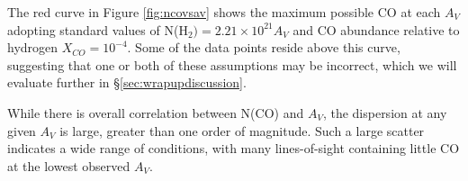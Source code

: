 \documentclass[times,astrosymb,twocolumn]{aastex631}
\def\todo#1{\textcolor{red}{#1}}
\def\rr#1{#1}
\begin{document}
The red curve in Figure \ref{fig:ncovsav} shows the maximum possible CO at each $A_V$ adopting standard values of  N(H$_2)=2.21\times10^{21} A_V$ \citep{Guver2009} and CO abundance relative to hydrogen $X_{CO}=10^{-4}$.
Some of the data \rr{points reside} above this \rr{curve}, suggesting that one or both of these assumptions may be incorrect, which we will evaluate further in \S \ref{sec:wrapupdiscussion}.

While there is overall correlation between N(CO) and $A_V$, the dispersion at any given $A_V$ is large, \rr{greater than one} order of magnitude.
Such a large scatter indicates a wide range of conditions, with many lines-of-sight containing little CO at the lowest observed $A_V$.


\end{document}
